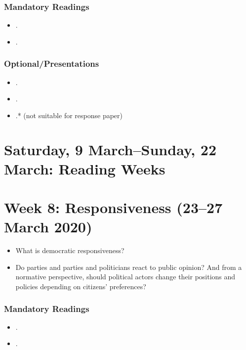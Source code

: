 \documentclass[abstract=on,parskip=full,headings=standardclasses,fontsize=11pt,paper=a4]{scrartcl}
\begin{document}
\subsubsection*{Mandatory Readings}
\begin{itemize}
\item {}.
\item {}.
\end{itemize}


\subsubsection*{Optional/Presentations}
\begin{itemize}
\item {}.
\item {}.
\item {}.*  (not suitable for response paper)
\end{itemize}


\section{Saturday, 9 March--Sunday, 22 March: Reading Weeks}


\section{Week 8:  Responsiveness (23--27 March 2020)}

\begin{itemize}
\renewcommand\labelitemi{--}
\item What is democratic responsiveness?
\item Do parties and parties and politicians react to public opinion?  And from a normative perspective, should political actors change their positions and policies depending on citizens' preferences?
\end{itemize}

\subsubsection*{Mandatory Readings}
\begin{itemize}
\item {}.
\item {}.
\end{itemize}
\end{document}
